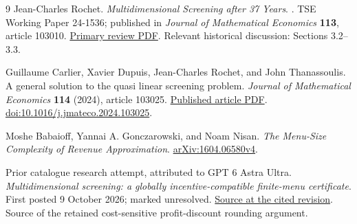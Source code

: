 \documentclass[11pt,a4paper]{article}
\numberwithin{equation}{section}
\begin{document}
\begin{thebibliography}{9}
Jean-Charles Rochet.
\newblock \emph{Multidimensional Screening after 37 Years}.
. TSE Working Paper 24-1536; published in
\emph{Journal of Mathematical Economics} \textbf{113}, article 103010.
\newblock \href{https://www.tse-fr.eu/sites/default/files/TSE/documents/doc/wp/2024/wp_tse_1536.pdf}
{Primary review PDF}. Relevant historical discussion: Sections 3.2--3.3.

Guillaume Carlier, Xavier Dupuis, Jean-Charles Rochet, and John Thanassoulis.
\newblock A general solution to the quasi linear screening problem.
\newblock \emph{Journal of Mathematical Economics} \textbf{114} (2024),
article 103025.
\newblock \href{https://xdupuis.perso.math.cnrs.fr/publications/screening-algo_paper.pdf}
{Published article PDF}.
\newblock \href{https://doi.org/10.1016/j.jmateco.2024.103025}
{doi:10.1016/j.jmateco.2024.103025}.

Moshe Babaioff, Yannai A. Gonczarowski, and Noam Nisan.
\newblock \emph{The Menu-Size Complexity of Revenue Approximation}.
\newblock \href{https://arxiv.org/abs/1604.06580v4}{arXiv:1604.06580v4}.

Prior catalogue research attempt, attributed to GPT 6 Astra Ultra.
\newblock \emph{Multidimensional screening: a globally
incentive-compatible finite-menu certificate}.
\newblock First posted
9 October 2026; marked unresolved.
\newblock \href{https://github.com/mehmetmars7/Erdosproblems-llm-hunter/blob/00ced55ba1223fb48603e1f15028d753997ee515/attacks/open_problems/economics/gpt_6_astra_ultra/D82-92.tex}
{Source at the cited revision}.
\newblock Source of the retained cost-sensitive profit-discount
rounding argument.
\end{thebibliography}
\end{document}
